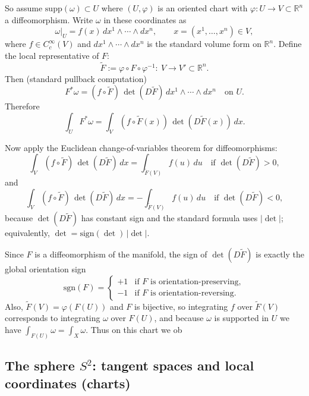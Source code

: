 \documentclass[12pt,a4paper]{article}
\theoremstyle{plain}
\theoremstyle{definition}      %
\begin{document}
	\medskip
	\noindent
	So assume $\mathrm{supp}(\omega)\subset U$ where $(U,\varphi)$ is an oriented chart with
	$\varphi:U\to V\subset\mathbb{R}^n$ a diffeomorphism.
	Write $\omega$ in these coordinates as
	\[
	\omega|_U = f(x)\,dx^1\wedge\cdots\wedge dx^n,
	\qquad x=(x^1,\dots,x^n)\in V,
	\]
	where $f\in C_c^\infty(V)$ and $dx^1\wedge\cdots\wedge dx^n$ is the standard volume form on $\mathbb{R}^n$.
	Define the local representative of $F$:
	\[
	\widetilde F := \varphi\circ F\circ \varphi^{-1}:\ V\to V' \subset \mathbb{R}^n.
	\]
	Then (standard pullback computation)
	\[
	F^*\omega = (f\circ \widetilde F)\,\det(D\widetilde F)\,dx^1\wedge\cdots\wedge dx^n
	\quad \text{on }U.
	\]
	Therefore
	\[
	\int_U F^*\omega
	= \int_V (f\circ \widetilde F(x))\,\det(D\widetilde F(x))\,dx.
	\]
	
	\medskip
	\noindent
	Now apply the Euclidean change-of-variables theorem for diffeomorphisms:
	\[
	\int_V (f\circ \widetilde F)\,\det(D\widetilde F)\,dx
	=
	\int_{\widetilde F(V)} f(u)\,du
	\quad \text{if }\det(D\widetilde F)>0,
	\]
	and
	\[
	\int_V (f\circ \widetilde F)\,\det(D\widetilde F)\,dx
	=
	-\int_{\widetilde F(V)} f(u)\,du
	\quad \text{if }\det(D\widetilde F)<0,
	\]
	because $\det(D\widetilde F)$ has constant sign and the standard formula uses $|\det|$;
	equivalently, $\det = \mathrm{sign}(\det)\,|\det|$.
	
	\medskip
	\noindent
	Since $F$ is a diffeomorphism of the manifold, the sign of $\det(D\widetilde F)$ is exactly the global orientation sign
	\[
	\mathrm{sgn}(F)=
	\begin{cases}
		+1 & \text{if $F$ is orientation-preserving},\\
		-1 & \text{if $F$ is orientation-reversing}.
	\end{cases}
	\]
	Also, $\widetilde F(V)=\varphi(F(U))$ and $F$ is bijective, so integrating $f$ over $\widetilde F(V)$ corresponds
	to integrating $\omega$ over $F(U)$, and because $\omega$ is supported in $U$ we have $\int_{F(U)}\omega=\int_X\omega$.
	Thus on this chart we ob
	
	
	
	\subsection*{The sphere $S^2$: tangent spaces and local coordinates (charts)}
	
\end{document}
